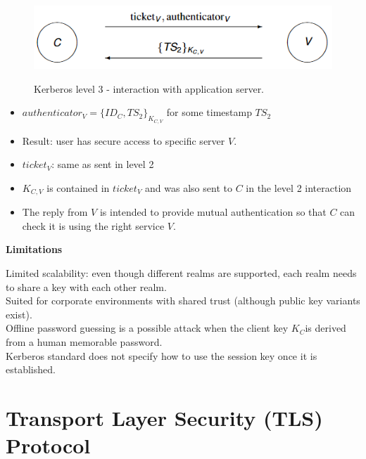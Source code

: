 \documentclass{article}
\begin{document}
\noindent\begin{minipage}{0.6\textwidth}%
\begin{figure}[H]
\centering
\includegraphics[scale=0.72]{Images/kerberoslevel3.png}
\label{fig:fround}
\caption{Kerberos level 3 - interaction with application server.}
\end{figure}
\end{minipage}%
\hfill%
\begin{minipage}{0.38\textwidth}
\begin{itemize}
    \item $authenticator_{V}=\{ID_C,TS_2\}_{K_{C,V}}$  for some timestamp $TS_2$
    \item Result: user has secure access to specific server $V$.
\end{itemize}
\end{minipage}
\begin{itemize}
    \item $ticket_{V}$: same as sent in level 2
    \item $K_{C,V}$ is contained in $ticket_V$ and was also sent to $C$ in the level 2 interaction
    \item The reply from $V$ is intended to provide mutual authentication so that $C$ can check it is using the right service $V$.
\end{itemize}

\textbf{Limitations}

Limited scalability: even though different realms are supported, each realm needs to share a key with each other realm.\\
Suited for corporate environments with shared trust (although public key variants exist).\\
Offline password guessing is a possible attack when the client key $K_C$is derived from a human memorable password.\\
Kerberos standard does not specify how to use the session key once it is established.

\newpage
\section{Transport Layer Security (TLS) Protocol}
\end{document}
